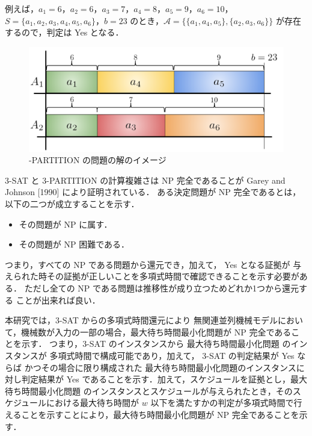 \documentclass[12pt]{optlab-bachelor}
\begin{document}
例えば，$a_1 = 6$，$a_2 = 6$，$a_3 = 7$，$a_4 = 8$，$a_5 = 9$，$a_6 = 10$，$S = \{a_1, a_2, a_3, a_4, a_5, a_6\}$，$b = 23$ のとき，$\mathcal{A} = \big\{\{a_1, a_4, a_5\}, \{a_2, a_3, a_6\}\big\}$ が存在するので，判定は Yes となる．

\begin{figure}[h]
  \centering
  \includegraphics[width = 12cm]{figure/3-PARTITION.pdf}
  \caption{{-PARTITION} の問題の解のイメージ}
\end{figure}

\textsc{3-SAT} と \textsc{3-PARTITION} の計算複雑さは NP 完全であることが Garey and Johnson [1990] \cite{3SAT} により証明されている．
ある決定問題が NP 完全であるとは，以下の二つが成立することを示す．
\begin{itemize}
  \item その問題が NP に属す．
  \item その問題が NP 困難である．
\end{itemize}
つまり，すべての NP である問題から還元でき，加えて， Yes となる証拠が
与えられた時その証拠が正しいことを多項式時間で確認できることを示す必要がある．
ただし全ての NP である問題は推移性が成り立つためどれか1つから還元する
ことが出来れば良い．

本研究では，\textsc{3-SAT} からの多項式時間還元により 無関連並列機械モデルにおいて，機械数が入力の一部の場合，最大待ち時間最小化問題が NP 完全であることを示す．
つまり，\textsc{3-SAT} のインスタンスから 最大待ち時間最小化問題 のインスタンスが
多項式時間で構成可能であり，加えて， \textsc{3-SAT}  の判定結果が Yes ならば
かつその場合に限り構成された  最大待ち時間最小化問題のインスタンスに対し判定結果が Yes であることを示す．加えて，スケジュールを証拠とし，最大待ち時間最小化問題 のインスタンスとスケジュールが与えられたとき，そのスケジュールにおける最大待ち時間が $w$ 以下を満たすかの判定が多項式時間で行えることを示すことにより，最大待ち時間最小化問題が NP 完全であることを示す．
\end{document}
